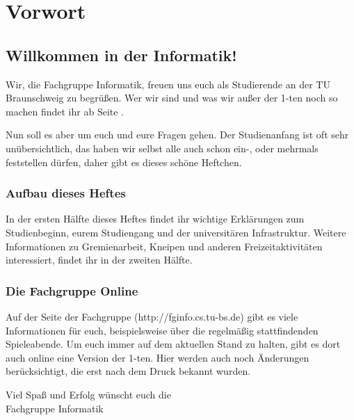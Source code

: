 
\section{Vorwort}
\label{vorwort}
	\begin{multicols}{2}
	\subsection*{Willkommen in der Informatik!}	
	Wir, die Fachgruppe Informatik, freuen uns euch als Studierende an der TU Braunschweig zu begrüßen. Wer wir sind und was wir außer der 1-ten noch so machen findet ihr ab Seite \pageref{fachgruppe}.

	Nun soll es aber um euch und eure Fragen gehen. Der Studienanfang ist oft sehr unübersichtlich, das haben wir selbst alle auch schon ein-, oder mehrmals feststellen dürfen, daher gibt es dieses schöne Heftchen.

	\subsubsection*{Aufbau dieses Heftes}
		In der ersten Hälfte dieses Heftes findet ihr wichtige Erklärungen zum Studienbeginn, eurem Studiengang und der universitären Infrastruktur. Weitere Informationen zu Gremienarbeit, Kneipen und anderen Freizeitaktivitäten interessiert, findet ihr in der zweiten Hälfte.

	\subsubsection*{Die Fachgruppe Online}
		Auf der Seite der Fachgruppe (http://fginfo.cs.tu-bs.de) gibt es viele Informationen für euch, beispielsweise über die regelmäßig stattfindenden Spieleabende. Um euch immer auf dem aktuellen Stand zu halten, gibt es dort auch online eine Version der 1-ten. Hier werden auch noch Änderungen berücksichtigt, die erst nach dem Druck bekannt wurden. 

	\vspace*{0.5cm}

	Viel Spaß und Erfolg wünscht euch die\\
	\hspace*{2cm}Fachgruppe Informatik
	\end{multicols}